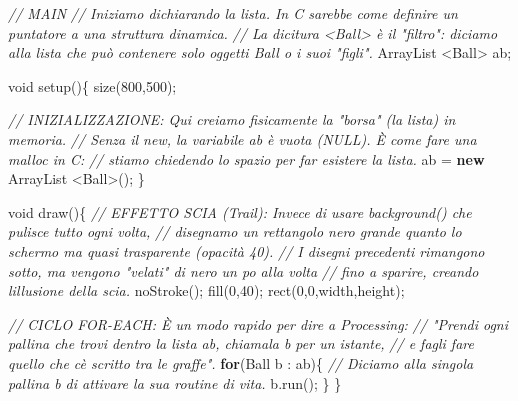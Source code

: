 \documentclass[
]{article}
\newenvironment{Shaded}{}{}
\newcommand{\BuiltInTok}[1]{\textcolor[rgb]{0.00,0.50,0.00}{#1}}
\newcommand{\CommentTok}[1]{\textcolor[rgb]{0.38,0.63,0.69}{\textit{#1}}}
\newcommand{\ControlFlowTok}[1]{\textcolor[rgb]{0.00,0.44,0.13}{\textbf{#1}}}
\newcommand{\DataTypeTok}[1]{\textcolor[rgb]{0.56,0.13,0.00}{#1}}
\newcommand{\DecValTok}[1]{\textcolor[rgb]{0.25,0.63,0.44}{#1}}
\newcommand{\FunctionTok}[1]{\textcolor[rgb]{0.02,0.16,0.49}{#1}}
\newcommand{\KeywordTok}[1]{\textcolor[rgb]{0.00,0.44,0.13}{\textbf{#1}}}
\newcommand{\NormalTok}[1]{#1}
\newcommand{\OperatorTok}[1]{\textcolor[rgb]{0.40,0.40,0.40}{#1}}
\begin{document}
\begin{Shaded}
\begin{Highlighting}[]
\CommentTok{// MAIN}
\CommentTok{// Iniziamo dichiarando la lista. In C sarebbe come definire un puntatore a una struttura dinamica.}
\CommentTok{// La dicitura \textless{}Ball\textgreater{} è il "filtro": diciamo alla lista che può contenere solo oggetti Ball o i suoi "figli".}
\BuiltInTok{ArrayList} \OperatorTok{\textless{}}\NormalTok{Ball}\OperatorTok{\textgreater{}}\NormalTok{ ab}\OperatorTok{;}

\DataTypeTok{void} \FunctionTok{setup}\OperatorTok{()\{}
  \FunctionTok{size}\OperatorTok{(}\DecValTok{800}\OperatorTok{,}\DecValTok{500}\OperatorTok{);}
  
  \CommentTok{// INIZIALIZZAZIONE: Qui creiamo fisicamente la "borsa" (la lista) in memoria.}
  \CommentTok{// Senza il \textquotesingle{}new\textquotesingle{}, la variabile \textquotesingle{}ab\textquotesingle{} è vuota (NULL). È come fare una malloc in C: }
  \CommentTok{// stiamo chiedendo lo spazio per far esistere la lista.}
\NormalTok{  ab }\OperatorTok{=} \KeywordTok{new} \BuiltInTok{ArrayList} \OperatorTok{\textless{}}\NormalTok{Ball}\OperatorTok{\textgreater{}();} 
\OperatorTok{\}}

\DataTypeTok{void} \FunctionTok{draw}\OperatorTok{()\{}
  \CommentTok{// EFFETTO SCIA (Trail): Invece di usare background() che pulisce tutto ogni volta, }
  \CommentTok{// disegnamo un rettangolo nero grande quanto lo schermo ma quasi trasparente (opacità 40).}
  \CommentTok{// I disegni precedenti rimangono sotto, ma vengono "velati" di nero un po\textquotesingle{} alla volta }
  \CommentTok{// fino a sparire, creando l\textquotesingle{}illusione della scia.}
  \FunctionTok{noStroke}\OperatorTok{();}
  \FunctionTok{fill}\OperatorTok{(}\DecValTok{0}\OperatorTok{,}\DecValTok{40}\OperatorTok{);}
  \FunctionTok{rect}\OperatorTok{(}\DecValTok{0}\OperatorTok{,}\DecValTok{0}\OperatorTok{,}\NormalTok{width}\OperatorTok{,}\NormalTok{height}\OperatorTok{);}

  \CommentTok{// CICLO FOR{-}EACH: È un modo rapido per dire a Processing:}
  \CommentTok{// "Prendi ogni pallina che trovi dentro la lista \textquotesingle{}ab\textquotesingle{}, chiamala \textquotesingle{}b\textquotesingle{} per un istante, }
  \CommentTok{// e fagli fare quello che c\textquotesingle{}è scritto tra le graffe".}
  \ControlFlowTok{for}\OperatorTok{(}\NormalTok{Ball b }\OperatorTok{:}\NormalTok{ ab}\OperatorTok{)\{}
    \CommentTok{// Diciamo alla singola pallina \textquotesingle{}b\textquotesingle{} di attivare la sua routine di vita.}
\NormalTok{    b}\OperatorTok{.}\FunctionTok{run}\OperatorTok{();}
  \OperatorTok{\}}
\OperatorTok{\}}


\end{Highlighting}
\end{Shaded}
\end{document}
